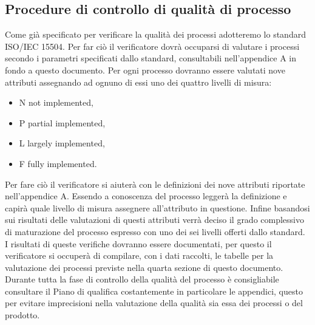 \subsection{Procedure di controllo di qualità di processo}
Come già specificato per verificare la qualità dei processi adotteremo lo standard ISO/IEC 15504. Per far ciò il verificatore dovrà occuparsi di valutare i processi secondo i parametri specificati dallo standard, consultabili nell'appendice A in fondo a questo documento.
Per ogni processo dovranno essere valutati nove attributi assegnando ad ognuno di essi uno dei quattro livelli di misura: 
\begin{itemize}
\item N not implemented, 
\item P partial implemented, 
\item L largely implemented, 
\item F fully implemented.
\end{itemize}
Per fare ciò il verificatore si aiuterà con le definizioni dei nove attributi riportate nell'appendice A. Essendo a conoscenza del processo leggerà la definizione e capirà quale livello di misura assegnere all'attributo in questione.
Infine basandosi sui risultati delle valutazioni di questi attributi verrà deciso il grado complessivo di maturazione del processo espresso con uno dei sei livelli offerti dallo standard. I risultati di queste verifiche dovranno essere documentati, per questo il verificatore si occuperà di compilare, con i dati raccolti, le tabelle per la valutazione dei processi previste nella quarta sezione di questo documento.
Durante tutta la fase di controllo della qualità del processo è consigliabile consultare il Piano di qualifica costantemente in particolare le appendici, questo per evitare imprecisioni nella valutazione della qualità sia essa dei processi o del prodotto.